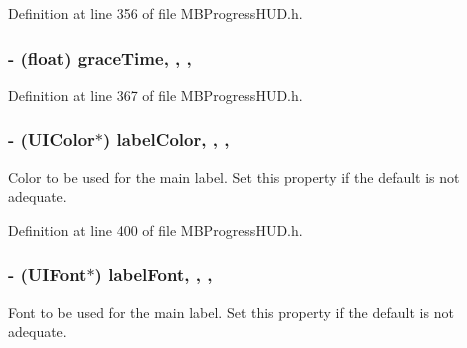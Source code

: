 Definition at line 356 of file M\+B\+Progress\+H\+U\+D.\+h.

\hypertarget{interface_m_b_progress_h_u_d_a6f837c351a405d0bb6ec05856d7776dd}{
\subsubsection[{grace\+Time}]{\setlength{\rightskip}{0pt plus 5cm}-\/ (float) grace\+Time\hspace{0.3cm}{\ttfamily [read]}, {\ttfamily [write]}, {\ttfamily [atomic]}, {\ttfamily [assign]}}}\label{interface_m_b_progress_h_u_d_a6f837c351a405d0bb6ec05856d7776dd}


Definition at line 367 of file M\+B\+Progress\+H\+U\+D.\+h.

\hypertarget{interface_m_b_progress_h_u_d_a04eba696a66f65d28b485bb5f0a940cd}{
\subsubsection[{label\+Color}]{\setlength{\rightskip}{0pt plus 5cm}-\/ (U\+I\+Color$\ast$) label\+Color\hspace{0.3cm}{\ttfamily [read]}, {\ttfamily [write]}, {\ttfamily [atomic]}, {\ttfamily [assign]}}}\label{interface_m_b_progress_h_u_d_a04eba696a66f65d28b485bb5f0a940cd}
Color to be used for the main label. Set this property if the default is not adequate. 

Definition at line 400 of file M\+B\+Progress\+H\+U\+D.\+h.

\hypertarget{interface_m_b_progress_h_u_d_ae61e736a34f341f4190b065f19010af8}{
\subsubsection[{label\+Font}]{\setlength{\rightskip}{0pt plus 5cm}-\/ (U\+I\+Font$\ast$) label\+Font\hspace{0.3cm}{\ttfamily [read]}, {\ttfamily [write]}, {\ttfamily [atomic]}, {\ttfamily [assign]}}}\label{interface_m_b_progress_h_u_d_ae61e736a34f341f4190b065f19010af8}
Font to be used for the main label. Set this property if the default is not adequate. 

